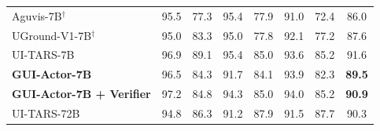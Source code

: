 \begin{table}[!t]
{\begin{tabular}{lccccccc}
Aguvis-7B$^{\dagger}$ & 95.5 & 77.3 & 95.4 & 77.9 & 91.0 & 72.4 & \cellcolor{lightblue}86.0\\
UGround-V1-7B$^{\dagger}$ & 95.0 & 83.3 & 95.0 & 77.8 & 92.1 & 77.2 & \cellcolor{lightblue}87.6 \\
UI-TARS-7B & 96.9 & 89.1 & 95.4 & 85.0 & 93.6 & 85.2 & \cellcolor{lightblue}91.6 \\
\cellcolor{lightblue}\textbf{GUI-Actor-7B} & \cellcolor{lightblue}96.5 & \cellcolor{lightblue}84.3 & \cellcolor{lightblue}91.7 & \cellcolor{lightblue}84.1 & \cellcolor{lightblue}93.9 & \cellcolor{lightblue}82.3 & \cellcolor{lightblue}\textbf{89.5} \\
\cellcolor{lightblue}\textbf{GUI-Actor-7B + Verifier} & 
\cellcolor{lightblue}97.2 & \cellcolor{lightblue}84.8 & \cellcolor{lightblue}94.3 & \cellcolor{lightblue}85.0 & \cellcolor{lightblue}94.0 & \cellcolor{lightblue}85.2 & \cellcolor{lightblue}\textbf{90.9} \\
\midrule
UI-TARS-72B & 94.8 & 86.3 & 91.2 & 87.9 & 91.5 & 87.7 & \cellcolor{lightblue}90.3 \\


\bottomrule
\end{tabular}
}
\label{tab:screenspot_v2}
\end{table}